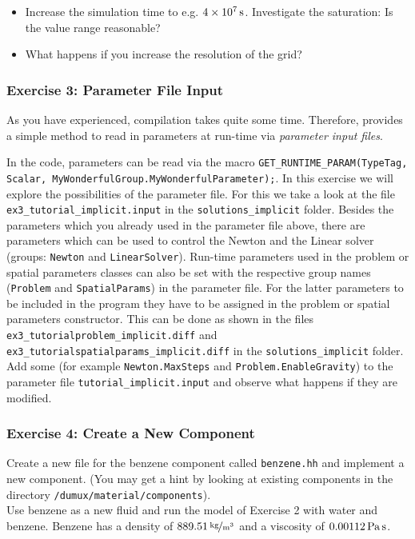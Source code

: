 \begin{itemize}
 \item Increase the simulation time to e.g. $\unit[4\times 10^7]{s}$. Investigate the saturation: Is the value range reasonable?
 \item What happens if you increase the resolution of the grid?
\end{itemize}

\subsubsection{Exercise 3: Parameter File Input}
As you have experienced, compilation takes quite some time. Therefore,
\Dumux provides a simple method to read in parameters at run-time
via \textit{parameter input files}.

In the code, parameters can be read via the macro
\texttt{GET\_RUNTIME\_PARAM(TypeTag, Scalar, 
MyWonderful\allowbreak Group.MyWonderfulParameter);}. In this exercise we will explore the possibilities of the
parameter file. For this we take a look at the file \texttt{ex3\_tutorial\_implicit.input} in the \texttt{solutions\_implicit} folder.
Besides the parameters which you already used in the parameter file above,
there are parameters which can be used to control the
Newton and the Linear solver (groups: \texttt{Newton} and \texttt{LinearSolver}).
Run-time parameters used in the problem or spatial parameters classes
can also be set with the respective group names (\texttt{Problem} and \texttt{SpatialParams})
in the parameter file. For the latter parameters to be included in the program
they have to be assigned in the problem or spatial parameters constructor. This
can be done as shown in the files \texttt{ex3\_tutorialproblem\_implicit.diff}
and \texttt{ex3\_tutorialspatialparams\_implicit.diff} in the \texttt{solutions\_implicit} folder. Add some (for
example \texttt{Newton.MaxSteps} and \texttt{Problem.EnableGravity}) to the
parameter file \texttt{tutorial\_implicit.input} and observe what
happens if they are modified.

\subsubsection{Exercise 4: Create a New Component}
Create a new file for the benzene component called \texttt{benzene.hh}
and implement a new component. (You may get a hint by looking at
existing components in the directory \verb+/dumux/material/components+). \\
Use benzene as a new fluid and run the model of Exercise 2 with water
and benzene. Benzene has a density of $\unitfrac[889.51]{kg}{m^3}$ and
a viscosity of $\unit[0.00112]{Pa \, s}$.

